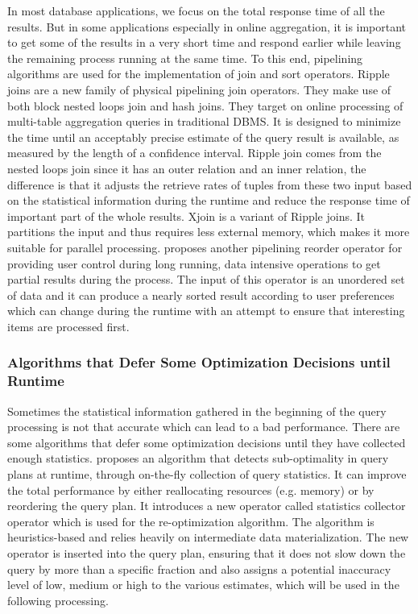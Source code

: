 In most database applications, we focus on the total response time of all the results. But in some applications especially in online aggregation, it is important to get some of the results in a very short time and respond earlier while leaving the remaining process running at the same time. To this end, pipelining algorithms are used for the implementation of join and sort operators. Ripple joins \cite{Haas:1999:RJO:304182.304208} are a new family of physical pipelining join operators. They make use of both block nested loops join and hash joins. They target on online processing of multi-table aggregation queries in traditional DBMS. It is designed to minimize the time until an acceptably precise estimate of the query result is available, as measured by the length of a confidence interval. Ripple join comes from the nested loops join since it has an outer relation and an inner relation, the difference is that it adjusts the retrieve rates of tuples from these two input based on the statistical information during the runtime and reduce the response time of important part of the whole results. Xjoin \cite{urhan2000xjoin} is a variant of Ripple joins. It partitions the input and thus requires less external memory, which makes it more suitable for parallel processing. \cite{Raman:2000:ODR:765233.765239} proposes another pipelining reorder operator for providing user control during long running, data intensive operations to get partial results during the process. The input of this operator is an unordered set of data and it can produce a nearly sorted result according to user preferences which can change during the runtime with an attempt to ensure that interesting items are processed first.


\subsubsection{Algorithms that Defer Some Optimization Decisions until Runtime}

Sometimes the statistical information gathered in the beginning of the query processing is not that accurate which can lead to a bad performance. There are some algorithms that defer some optimization decisions until they have collected enough statistics. \cite{Kabra:1998:EMR:276305.276315} proposes an algorithm that detects sub-optimality in query plans at runtime, through on-the-fly collection of query statistics. It can improve the total performance by either reallocating resources (e.g. memory) or by reordering the query plan. It introduces a new operator called statistics collector operator which is used for the re-optimization algorithm. The algorithm is heuristics-based and relies heavily on intermediate data materialization. The new operator is inserted into the query plan, ensuring that it does not slow down the query by more than a specific fraction and also assigns a potential inaccuracy level of low, medium or high to the various estimates, which will be used in the following processing.


